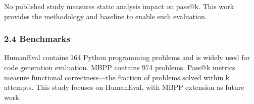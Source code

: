 No published study measures static analysis impact on pass@k. This work provides the methodology and baseline to enable such evaluation.

\subsubsection{2.4 Benchmarks}

HumanEval \citep{chen2021humaneval} contains 164 Python programming problems and is widely used for code generation evaluation. MBPP \citep{austin2021mbpp} contains 974 problems. Pass@k metrics measure functional correctness---the fraction of problems solved within k attempts. This study focuses on HumanEval, with MBPP extension as future work.
